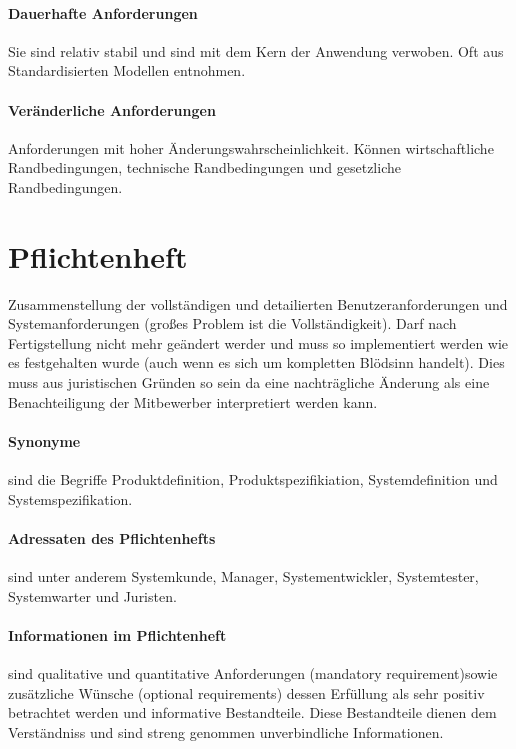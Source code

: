 \paragraph{Dauerhafte Anforderungen}
Sie sind relativ stabil und sind mit dem Kern der Anwendung verwoben. Oft aus Standardisierten Modellen entnohmen.

\paragraph{Veränderliche Anforderungen}
Anforderungen mit hoher Änderungswahrscheinlichkeit. Können wirtschaftliche Randbedingungen, technische Randbedingungen und gesetzliche Randbedingungen.

\section{Pflichtenheft}
Zusammenstellung der vollständigen und detailierten Benutzeranforderungen und Systemanforderungen (großes Problem ist die Vollständigkeit). Darf nach Fertigstellung nicht mehr geändert werder und muss so implementiert werden wie es festgehalten wurde (auch wenn es sich um kompletten Blödsinn handelt). Dies muss aus juristischen Gründen so sein da eine nachträgliche Änderung als eine Benachteiligung der Mitbewerber interpretiert werden kann.

\paragraph{Synonyme} sind die Begriffe Produktdefinition, Produktspezifikiation, Systemdefinition und Systemspezifikation.

\paragraph{Adressaten des Pflichtenhefts} sind unter anderem Systemkunde, Manager, Systementwickler, Systemtester, Systemwarter und Juristen. 

\paragraph{Informationen im Pflichtenheft} sind qualitative und quantitative Anforderungen (mandatory requirement)sowie zusätzliche Wünsche (optional requirements) dessen Erfüllung als sehr positiv betrachtet werden und informative Bestandteile. Diese Bestandteile dienen dem Verständniss und sind streng genommen unverbindliche Informationen.

